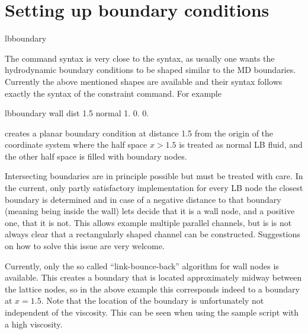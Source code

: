 \section{Setting up boundary conditions}
\begin{essyntax}
  lbboundary   
  \begin{features}
  \end{features}
\end{essyntax}
The  command syntax is very close to the  syntax, as 
usually one wants the hydrodynamic boundary conditions to be shaped similar to 
the MD boundaries. Currently the above mentioned shapes are available and their syntax follows exactly
the syntax of the constraint command. For example
\begin{tclcode}
  lbboundary wall dist 1.5 normal 1. 0. 0. 
\end{tclcode}
creates a planar boundary condition at distance 1.5 from the origin of the coordinate system
where the half space $x>1.5$ is treated as normal LB fluid, and the other half space 
is filled with boundary nodes.

Intersecting boundaries are in principle possible but must be treated with care. In the current,
only partly satisfactory implementation for every LB node the closest boundary is determined
and in case of a negative distance to that boundary (meaning being inside the wall) lets \es decide that
it is a wall node, and a positive one, that it is not.
This allows example multiple parallel channels, but is is not always clear that a rectangularly shaped
channel can be constructed. Suggestions on how to solve this issue are very welcome.

Currently, only the so called ``link-bounce-back'' algorithm for wall nodes is available. This creates a boundary that
is located approximately midway between the lattice nodes, so in the above example this corresponds indeed to 
a boundary at $x=1.5$. Note that the location of the boundary is unfortunately not independent of the 
viscosity. This can \eg be seen when using the sample script 
with a high viscosity.
